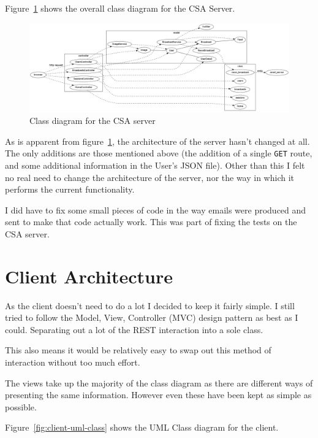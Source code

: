 \documentclass{article}
\begin{document}
Figure~\ref{fig:server-uml-class} shows the overall class diagram for the CSA Server.

\begin{figure}[h]
\centering
\includegraphics[width=.95\textheight, angle=90]{img/server-uml-class.png}
\caption{Class diagram for the CSA server}
\label{fig:server-uml-class}
\end{figure}

As is apparent from figure~\ref{fig:server-uml-class}, the architecture of the server
hasn't changed at all. The only additions are those mentioned above (the addition of a
single \verb$GET$ route, and some additional information in the User's JSON file). Other
than this I felt no real need to change the architecture of the server, nor the way in
which it performs the current functionality.

I did have to fix some small pieces of code in the way emails were produced and sent to
make that code actually work. This was part of fixing the tests on the CSA server.

\clearpage
\section{Client Architecture}
As the client doesn't need to do a lot I decided to keep it fairly simple. I still tried
to follow the Model, View, Controller (MVC) design pattern as best as I could. Separating
out a lot of the REST interaction into a sole class.

This also means it would be relatively easy to swap out this method of interaction 
without too much effort.

The views take up the majority of the class diagram as there are different ways of 
presenting the same information. However even these have been kept as simple as possible.

Figure~\ref{fig:client-uml-class} shows the UML Class diagram for the client.
\end{document}
